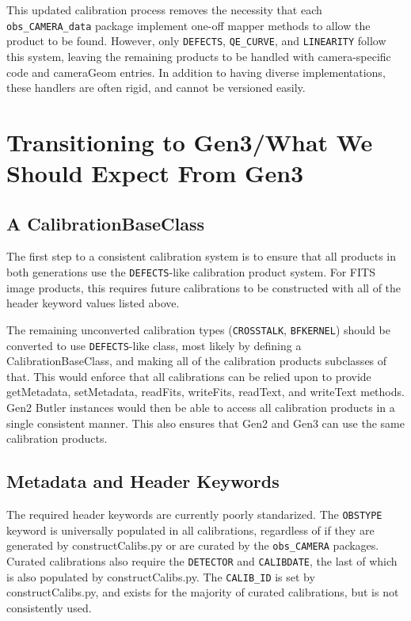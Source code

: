 \documentclass[DM,authoryear,toc]{lsstdoc}
\begin{document}
This updated calibration process removes the necessity that each
\verb|obs_CAMERA_data| package implement one-off mapper methods to allow the
product to be found.  However, only \verb|DEFECTS|, \verb|QE_CURVE|, and \verb|LINEARITY|
follow this system, leaving the remaining products to be handled with
camera-specific code and cameraGeom entries.  In addition to having
diverse implementations, these handlers are often rigid, and cannot be
versioned easily.

\section{Transitioning to Gen3/What We Should Expect From Gen3}

\subsection{A CalibrationBaseClass}
The first step to a consistent calibration system is to ensure that
all products in both generations use the \verb|DEFECTS|-like calibration
product system.  For FITS image products, this requires future
calibrations to be constructed with all of the header keyword values
listed above.

The remaining unconverted calibration types (\verb|CROSSTALK|, \verb|BFKERNEL|)
should be converted to use \verb|DEFECTS|-like class, most likely by defining
a CalibrationBaseClass, and making all of the calibration products
subclasses of that.  This would enforce that all calibrations can be
relied upon to provide getMetadata, setMetadata, readFits, writeFits,
readText, and writeText methods.  Gen2 Butler instances would then be
able to access all calibration products in a single consistent manner.
This also ensures that Gen2 and Gen3 can use the same calibration
products.

\subsection{Metadata and Header Keywords}

The required header keywords are currently poorly standarized.  The
\verb|OBSTYPE| keyword is universally populated in all calibrations,
regardless of if they are generated by constructCalibs.py or are
curated by the \verb|obs_CAMERA| packages.  Curated calibrations also
require the \verb|DETECTOR| and \verb|CALIBDATE|, the last of which is
also populated by constructCalibs.py.  The \verb|CALIB_ID| is set by
constructCalibs.py, and exists for the majority of curated
calibrations, but is not consistently used.
\end{document}
